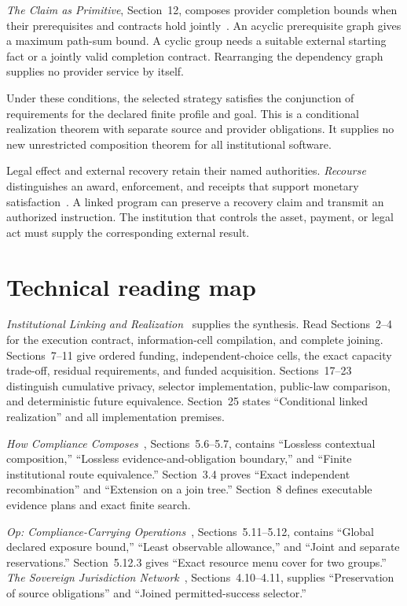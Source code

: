 \documentclass{momentum}
\begin{document}
\emph{The Claim as Primitive}, Section~12, composes provider completion bounds when their prerequisites and contracts hold jointly~\cite{claim}.
An acyclic prerequisite graph gives a maximum path-sum bound.
A cyclic group needs a suitable external starting fact or a jointly valid completion contract.
Rearranging the dependency graph supplies no provider service by itself.

Under these conditions, the selected strategy satisfies the conjunction of requirements for the declared finite profile and goal.
This is a conditional realization theorem with separate source and provider obligations.
It supplies no new unrestricted composition theorem for all institutional software.

Legal effect and external recovery retain their named authorities.
\emph{Recourse} distinguishes an award, enforcement, and receipts that support monetary satisfaction~\cite{recourse}.
A linked program can preserve a recovery claim and transmit an authorized instruction.
The institution that controls the asset, payment, or legal act must supply the corresponding external result.

\section{Technical reading map}
\label{sec:reading-map}

\emph{Institutional Linking and Realization}~\cite{linking} supplies the synthesis.
Read Sections~2--4 for the execution contract, information-cell compilation, and complete joining.
Sections~7--11 give ordered funding, independent-choice cells, the exact capacity trade-off, residual requirements, and funded acquisition.
Sections~17--23 distinguish cumulative privacy, selector implementation, public-law comparison, and deterministic future equivalence.
Section~25 states ``Conditional linked realization'' and all implementation premises.

\emph{How Compliance Composes}~\cite{compliance}, Sections~5.6--5.7, contains ``Lossless contextual composition,'' ``Lossless evidence-and-obligation boundary,'' and ``Finite institutional route equivalence.''
Section~3.4 proves ``Exact independent recombination'' and ``Extension on a join tree.''
Section~8 defines executable evidence plans and exact finite search.

\emph{Op: Compliance-Carrying Operations}~\cite{op}, Sections~5.11--5.12, contains ``Global declared exposure bound,'' ``Least observable allowance,'' and ``Joint and separate reservations.''
Section~5.12.3 gives ``Exact resource menu cover for two groups.''
\emph{The Sovereign Jurisdiction Network}~\cite{recognition}, Sections~4.10--4.11, supplies ``Preservation of source obligations'' and ``Joined permitted-success selector.''
\end{document}
